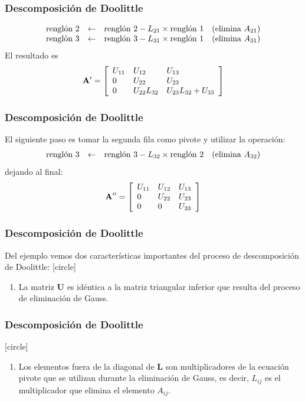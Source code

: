 \begin{frame}[fragile]
\frametitle{Descomposición de Doolittle}
\fontsize{12}{12}\selectfont
\[ \begin{array}{l l l l}
	\text{renglón } 2 & \leftarrow & \text{renglón } 2 - L_{21} \times \text{renglón } 1 & (\text{elimina } A_{21}) \\
	\text{renglón } 3 & \leftarrow & \text{renglón } 3 - L_{31} \times \text{renglón } 1 & (\text{elimina } A_{31})
	\end{array} \]
\fontsize{14}{14}\selectfont
El resultado es
\[ \mathbf{A}^{\prime} =
	\left[ \begin{array}{l l l}
		U_{11} & U_{12} & U_{13} \\
		0 & U_{22} & U_{23} \\
		0 & U_{22}L_{32} & U_{23}L_{32}+U_{33}
	\end{array} \right] \] 
\end{frame}
\begin{frame}
\frametitle{Descomposición de Doolittle}
El siguiente paso es tomar la segunda fila como pivote y utilizar la operación:
\fontsize{12}{12}\selectfont
\[ \begin{array}{l l l l}
	\text{renglón } 3 & \leftarrow & \text{renglón } 3 - L_{32} \times \text{renglón } 2 & (\text{elimina } A_{32})
	\end{array} \]
\fontsize{14}{14}\selectfont
dejando al final:
\[ \mathbf{A}^{\prime \prime} = \left[
	\begin{array}{l l l}
		U_{11} & U_{12} & U_{13} \\
		0 & U_{22} & U_{23} \\
		0 & 0 & U_{33}
	\end{array} \right] \]
\end{frame}
\begin{frame}
\frametitle{Descomposición de Doolittle}
Del ejemplo vemos dos características importantes del proceso de descomposición de Doolittle:
[circle]
\begin{enumerate}[<+->]
\item La matriz $\mathbf{U}$ es idéntica a la matriz triangular inferior que resulta del proceso de eliminación de Gauss.
\seti
\end{enumerate}
\end{frame}
\begin{frame}
\frametitle{Descomposición de Doolittle}
[circle]
\begin{enumerate}[<+->]
\conti
\item Los elementos fuera de la diagonal de $\mathbf{L}$ son multiplicadores de la ecuación pivote que se utilizan durante la eliminación de Gauss, es decir, $L_{ij}$ es el multiplicador que elimina el elemento $A_{ij}$.
\end{enumerate}
\end{frame}
